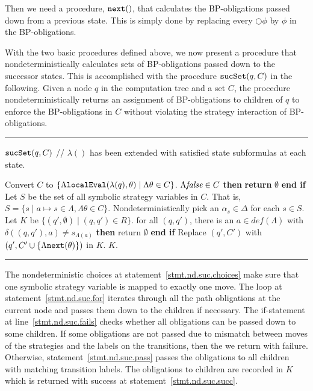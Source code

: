 \documentclass[11pt]{article}
\newcommand{\IFNLINE}[1]{\STATE {\bf if} #1 {\bf then} }
\newcommand{\ENDIFLINE}{\textbf{end if}}
\newcommand{\RETLINE}{\textbf{return} }
\newcommand{\procbegin}{\vspace*{3mm}\hrule\noindent}
\newcommand{\procend}{\vspace*{1mm}\hrule\vspace{3mm}}
\newcommand{\ttsynsuc}{\mbox{\tt sucSet}}
\newcommand{\tteval}{\mbox{\tt localEval}}
\newcommand{\ttnxt}{\mbox{\tt next}}
\newcommand{\emdef}{\textit{def}}
\newcommand{\false}{\mbox{\em false}}
\newcommand{\nxt}{\bigcirc}
\begin{document}
Then we need a procedure, $\ttnxt()$, that calculates the BP-obligations 
passed down from a previous state. 
This is simply done by replacing every $\nxt\phi$ by $\phi$ in the 
BP-obligations.  

With the two basic procedures defined above, 
we now present a procedure that nondeterministically calculates 
sets of BP-obligations passed down to the successor states. 
This is accomplished with the procedure $\ttsynsuc(q,C)$ 
in the following.  
Given a node $q$ in the computation tree and
a set $C$, the procedure 
nondeterministically returns an assignment of BP-obligations 
to children of $q$ to enforce the BP-obligations in $C$
without violating the strategy interaction of BP-obligations.  
\label{tab.nd.suc}
\procbegin
$\ttsynsuc(q,C)$ // $\lambda()$ has been extended with 
			satisfied state subformulas at each state. 
\begin{algorithmic}[1]
\STATE Convert $C$ to 
  $\{\Lambda\tteval(\lambda(q),\theta)\mid \Lambda\theta\in C\}$.  
\IFNLINE {$\Lambda\false\in C$} \RETLINE $\emptyset$ \ENDIFLINE 
\STATE Let $S$ be the set of all symbolic strategy variables in $C$.  
  That is, $S=\{s\mid a\mapsto s\in \Lambda, \Lambda\theta\in C\}$. 
\STATE Nondeterministically pick an $\alpha_s\in \Delta$ for each 
	$s\in S$.  \label{stmt.nd.suc.choices} 
\STATE Let $K$ be $\{(q',\emptyset)\mid (q,q')\in R\}$.  
  	\label{stmt.nd.suc.for}
  \IFNLINE {for all $(q,q')$, there is an $a\in\emdef(\Lambda)$
   \label{stmt.nd.suc.fails} 
    with $\delta((q,q'),a)\neq s_{\Lambda(a)}$} 
    return $\emptyset$ 
  \ENDIFLINE 
  \FOR {$(q',C')\in \Delta$ with $\forall a\in\emdef(\Lambda)
  	(\delta((q,q'),a)=s_{\Lambda(a)})$} \label{stmt.nd.suc.pass}  
      \STATE Replace $(q',C')$ with 
        $(q',C'\cup\{\Lambda\ttnxt(\theta)\})$ in $K$.
        \label{stmt.nd.suc.passCommit} 
    \ENDFOR
\ENDFOR 
\RETURN $K$.\label{stmt.nd.suc.succ} 
\end{algorithmic}
\procend
The nondeterministic choices at statement~\ref{stmt.nd.suc.choices} 
make sure that one symbolic strategy variable is mapped to exactly one move.  
The loop at statement~\ref{stmt.nd.suc.for} iterates through
all the path obligations at the current node and passes them down to
the children if necessary.
The if-statement at line~\ref{stmt.nd.suc.fails} checks 
whether all obligations can be passed down to some children.  
If some obligations are not passed due to mismatch between moves of the strategies 
and the labels on the transitions, then 
the we return with failure.  
Otherwise, 
statement~\ref{stmt.nd.suc.pass} passes 
the obligations to all children with matching transition labels. 
The obligations to children are recorded in $K$ which is returned with success 
at statement~\ref{stmt.nd.suc.succ}.  
\end{document}
